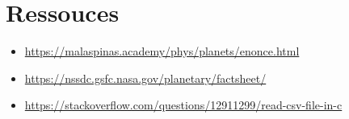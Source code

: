 \documentclass[a4paper,10pt]{article}
\begin{document}
    
    \section{Ressouces}\label{sec:ressouces}
    \begin{itemize}
        \item \href{https://malaspinas.academy/phys/planets/enonce.html}{https://malaspinas.academy/phys/planets/enonce.html}
        \item \href{https://nssdc.gsfc.nasa.gov/planetary/factsheet/}{https://nssdc.gsfc.nasa.gov/planetary/factsheet/}
        \item \href{https://stackoverflow.com/questions/12911299/read-csv-file-in-c}{https://stackoverflow.com/questions/12911299/read-csv-file-in-c}
    \end{itemize}
\end{document}
